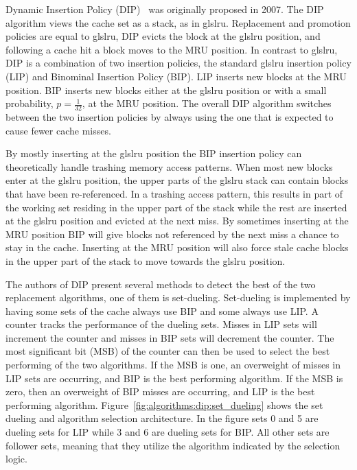 Dynamic Insertion Policy (DIP)~\cite{Qureshi2007} was originally proposed in 2007.
The DIP algorithm views the cache set as a stack, as in gls{lru}.
Replacement and promotion policies are equal to gls{lru}, DIP evicts the block at the gls{lru} position, and following a cache hit a block moves to the MRU position.
In contrast to gls{lru}, DIP is a combination of two insertion policies, the standard gls{lru} insertion policy (LIP) and Binominal Insertion Policy (BIP).
LIP inserts new blocks at the MRU position.
BIP inserts new blocks either at the gls{lru} position or with a small probability, $p = \frac{1}{32}$, at the MRU position. 
The overall DIP algorithm switches between the two insertion policies by always using the one that is expected to cause fewer cache misses.

By mostly inserting at the gls{lru} position the BIP insertion policy can theoretically handle trashing memory access patterns.
When most new blocks enter at the gls{lru} position, the upper parts of the gls{lru} stack can contain blocks that have been re-referenced.
In a trashing access pattern, this results in part of the working set residing in the upper part of the stack while the rest are inserted at the gls{lru} position and evicted at the next miss.
By sometimes inserting at the MRU position BIP will give blocks not referenced by the next miss a chance to stay in the cache. 
Inserting at the MRU position will also force stale cache blocks in the upper part of the stack to move towards the gls{lru} position.

The authors of DIP present several methods to detect the best of the two replacement algorithms, one of them is set-dueling.
Set-dueling is implemented by having some sets of the cache always use BIP and some always use LIP.
A counter tracks the performance of the dueling sets.
Misses in LIP sets will increment the counter and misses in BIP sets will decrement the counter.
The most significant bit (MSB) of the counter can then be used to select the best performing of the two algorithms.
If the MSB is one, an overweight of misses in LIP sets are occurring, and BIP is the best performing algorithm. 
If the MSB is zero, then an overweight of BIP misses are occurring, and LIP is the best performing algorithm.
Figure~\ref{fig:algorithms:dip:set_dueling} shows the set dueling and algorithm selection architecture.
In the figure sets 0 and 5 are dueling sets for LIP while 3 and 6 are dueling sets for BIP.
All other sets are follower sets, meaning that they utilize the algorithm indicated by the selection logic.

